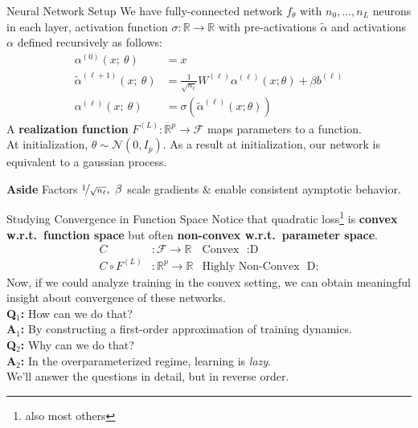 \documentclass{beamer}
\begin{document}
\begin{frame}{Neural Network Setup}
	We have fully-connected network $f_\theta$ with $n_0, \ldots, n_L$ neurons in each layer, activation function $\sigma: \mathbb{R} \rightarrow \mathbb{R}$ with pre-activations $\tilde{\alpha}$ and activations $\alpha$ defined recursively as follows:
	\begin{align}
		\alpha^{(0)}(x;~\theta) &= x \\
		\tilde{\alpha}^{(\ell + 1)}(x;~\theta) &= \frac{1}{\sqrt{n_\ell}} W^{(\ell)} \alpha^{(\ell)}(x; \theta) + \beta b^{(\ell)} \\
		\alpha^{(\ell)}(x;~\theta) &=  \sigma (\tilde{\alpha}^{(\ell)}(x; \theta))
	\end{align}
	A \textbf{realization function} $F^{(L)}: \mathbb{R}^p \rightarrow \mathcal{F}$ maps parameters to a function. \pause \newline \\
	\vspace{-.7em}
	At initialization, $\theta \sim \mathcal{N}(0, I_p)$. \pause As a result at initialization, our network is equivalent to a gaussian process. \pause

	\begin{block}{\bf Aside}
		Factors $\nicefrac{1}{\sqrt{n_\ell}},~\beta$ scale gradients \& enable consistent aymptotic behavior.
	\end{block}
\end{frame}

\begin{frame}{Studying Convergence in Function Space}
	Notice that quadratic loss\footnote{also most others} is \textbf{convex w.r.t.~function space} but often \textbf{non-convex w.r.t.~parameter space}.
	\begin{align}
		C&: \mathcal{F} \rightarrow \mathbb{R} & \text{Convex~ :D} \\ 
		C \circ F^{(L)}&: \mathbb{R}^p \rightarrow \mathbb{R} & \text{Highly Non-Convex~ D:}
	\end{align} \pause
	Now, if we could analyze training in the convex setting, we can obtain meaningful insight about convergence of these networks. \pause \\
	\textbf{Q${}_1$:} How can we do that? \\
	\textbf{A${}_1$:} By constructing a first-order approximation of training dynamics. \pause \newline \\

	\textbf{Q${}_2$:} Why can we do that? \pause \\
	\textbf{A${}_2$:} In the overparameterized regime, learning is \textit{lazy}. \pause \newline \\

	We'll answer the questions in detail, but in reverse order.
\end{frame}
\end{document}
